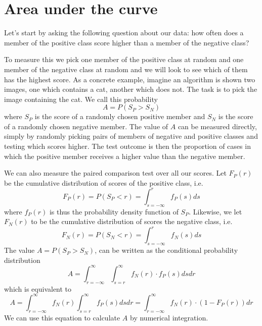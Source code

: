 \documentclass[preprint,12pt]{elsarticle}
\begin{document}
\section{Area under the curve} 

Let's start by asking the following question about our data: how often does a member of the positive class score higher than a member of the negative class? 

To measure this we pick one member of the positive class at random and one member of the negative class at random and we will look to see which of them has the highest score. As a concrete example, imagine an algorithm is shown two images, one which contains a cat, another which does not. The task is to pick the image containing the cat. We call this probability 
\[
A = P(S_P>S_N)
\]
where $S_P$ is the score of a randomly chosen positive member and $S_N$ is the score of a randomly chosen negative member. The value of $A$ can be measured directly, simply by randomly picking pairs of members of negative and positive classes and testing which scores higher. The test outcome is then the proportion of cases in which the positive member receives a higher value than the negative member.

We can also measure the paired comparison test over all our scores. Let $F_P(r)$ be the cumulative distribution of scores of the positive class, i.e. 
\begin{equation}
F_P(r) = P(S_P < r) = \int_{s=-\infty}^{r} f_P(s) ds \label{eq:ScorefPr}
\end{equation}
where $f_P(r)$ is thus the probability density function of $S_P$. Likewise, we let $F_N(r)$ to be the cumulative distribution of scores the negative class, i.e. 
\begin{equation}
F_N(r) = P(S_N < r) = \int_{s=-\infty}^{r} f_N(s) ds \label{eq:ScorenPr}
\end{equation}
The value $A=P(S_P>S_N)$, can be written as the conditional probability distribution
\begin{equation}
A = \int_{r=-\infty}^{\infty} \int_{s=r}^{\infty}  f_N(r) \cdot  f_P(s) ds dr  \label{eq:SPgreaterSN}
\end{equation}
which is equivalent to
\begin{equation}
A = \int_{r=-\infty}^{\infty}  f_N(r)  \int_{s=r}^{\infty}  f_P(s) ds dr  = \int_{r=-\infty}^{\infty}  f_N(r) \cdot  \left(1 -  F_P(r) \right) dr \label{eq:SPgreaterSN2}
\end{equation}
We can use this equation to calculate $A$ by numerical integration. 
\end{document}

